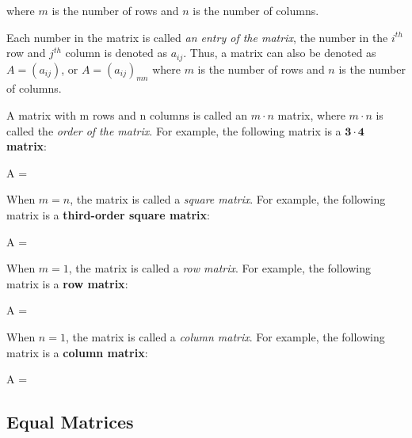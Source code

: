 \documentclass{report}
\begin{document}
\begin{multicols}{2}
  where $m$ is the number of rows and $n$ is the number of columns.

  Each number in the matrix is called \emph{an entry of the matrix}, the number
  in the $i^{th}$ row and $j^{th}$ column is denoted as $a_{ij}$. Thus, a matrix
  can also be denoted as $A = (a_{ij})$, or $A = {(a_{ij})}_{mn}$ where $m$ is
  the number of rows and $n$ is the number of columns.

  A matrix with m rows and n columns is called an $m \cdot n$ matrix, where $m
    \cdot n$ is called the \emph{order of the matrix}. For example, the following
  matrix is a \textbf{$\mathbf{3 \cdot 4}$ matrix}:
  \begin{cequation}
    A = 
  \end{cequation}

  When $m = n$, the matrix is called a \emph{square matrix}. For example, the
  following matrix is a \textbf{third-order square matrix}:
  \begin{cequation}
    A = 
  \end{cequation}

  When $m = 1$, the matrix is called a \emph{row matrix}. For example, the
  following matrix is a \textbf{row matrix}:
  \begin{cequation}
    A = 
  \end{cequation}

  When $n = 1$, the matrix is called a \emph{column matrix}. For example, the
  following matrix is a \textbf{column matrix}:
  \begin{cequation}
    A = 
  \end{cequation}

  \singlespacing{}

  \subsection*{Equal Matrices}


\end{multicols}
\end{document}
